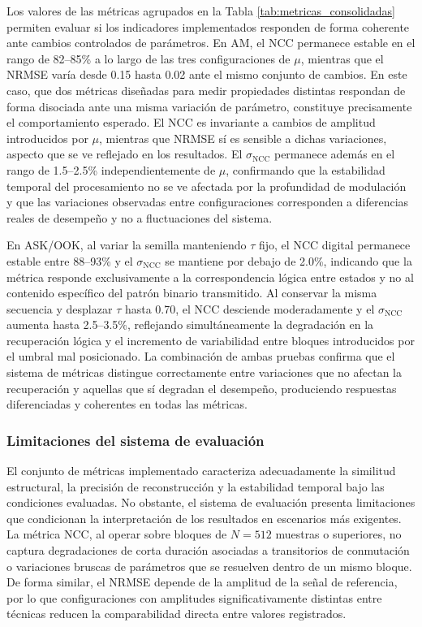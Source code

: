 Los valores de las métricas agrupados en la Tabla \ref{tab:metricas_consolidadas} permiten evaluar si los indicadores implementados responden de forma coherente ante cambios controlados de parámetros. En AM, el NCC permanece estable en el rango de 82--85\% a lo largo de las tres configuraciones de $\mu$, mientras que el NRMSE varía desde 0.15 hasta 0.02 ante el mismo conjunto de cambios. En este caso, que dos métricas diseñadas para medir propiedades distintas respondan de forma disociada ante una misma variación de parámetro, constituye precisamente el comportamiento esperado. El NCC es invariante a cambios de amplitud introducidos por $\mu$, mientras que NRMSE sí es sensible a dichas variaciones, aspecto que se ve reflejado en los resultados. El $\sigma_{\text{NCC}}$ permanece además en el rango de 1.5--2.5\% independientemente de $\mu$, confirmando que la estabilidad temporal del procesamiento no se ve afectada por la profundidad de modulación y que las variaciones observadas entre configuraciones corresponden a diferencias reales de desempeño y no a fluctuaciones del sistema.

En ASK/OOK, al variar la semilla manteniendo $\tau$ fijo, el NCC digital permanece estable entre 88--93\% y el $\sigma_{\text{NCC}}$ se mantiene por debajo de 2.0\%, indicando que la métrica responde exclusivamente a la correspondencia lógica entre estados y no al contenido específico del patrón binario transmitido. Al conservar la misma secuencia y desplazar $\tau$ hasta 0.70, el NCC desciende moderadamente y el $\sigma_{\text{NCC}}$ aumenta hasta 2.5--3.5\%, reflejando simultáneamente la degradación en la recuperación lógica y el incremento de variabilidad entre bloques introducidos por el umbral mal posicionado. La combinación de ambas pruebas confirma que el sistema de métricas distingue correctamente entre variaciones que no afectan la recuperación y aquellas que sí degradan el desempeño, produciendo respuestas diferenciadas y coherentes en todas las métricas.

\subsubsection{Limitaciones del sistema de evaluación}

El conjunto de métricas implementado caracteriza adecuadamente la similitud estructural, la precisión de reconstrucción y la estabilidad temporal bajo las condiciones evaluadas. No obstante, el sistema de evaluación presenta limitaciones que condicionan la interpretación de los resultados en escenarios más exigentes. La métrica NCC, al operar sobre bloques de $N = 512$ muestras o superiores, no captura degradaciones de corta duración asociadas a transitorios de conmutación o variaciones bruscas de parámetros que se resuelven dentro de un mismo bloque. De forma similar, el NRMSE depende de la amplitud de la señal de referencia, por lo que configuraciones con amplitudes significativamente distintas entre técnicas reducen la comparabilidad directa entre valores registrados.

